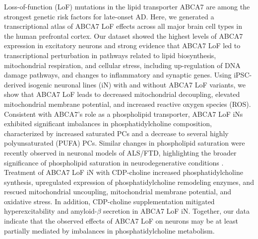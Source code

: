 Loss-of-function (LoF) mutations in the lipid transporter ABCA7 are among the strongest genetic risk factors for late-onset AD. Here, we generated a transcriptional atlas of ABCA7 LoF effects across all major brain cell types in the human prefrontal cortex. Our dataset showed the highest levels of ABCA7 expression in excitatory neurons and strong evidence that ABCA7 LoF led to transcriptional perturbation in pathways related to lipid biosynthesis, mitochondrial respiration, and cellular stress, including up-regulation of DNA damage pathways, and changes to inflammatory and synaptic genes. Using iPSC-derived isogenic neuronal lines (iN) with and without ABCA7 LoF variants, we show that ABCA7 LoF leads to decreased mitochondrial decoupling, elevated mitochondrial membrane potential, and increased reactive oxygen species (ROS). Consistent with ABCA7’s role as a phospholipid transporter, ABCA7 LoF iNs exhibited significant imbalances in phosphatidylcholine composition, characterized by increased saturated PCs and a decrease to several highly polyunsaturated (PUFA) PCs. Similar changes in phospholipid saturation were recently observed in neuronal models of ALS/FTD, highlighting the broader significance of phospholipid saturation in neurodegenerative conditions \cite{Giblin2025-ri}. Treatment of ABCA7 LoF iN with CDP-choline increased phosphatidylcholine synthesis, upregulated expression of phosphatidylcholine remodeling enzymes, and rescued mitochondrial uncoupling, mitochondrial membrane potential, and oxidative stress. In addition, CDP-choline supplementation mitigated hyperexcitability and amyloid-$\beta$ secretion in ABCA7 LoF iN. Together, our data indicate that the observed effects of ABCA7 LoF on neurons may be at least partially mediated by imbalances in phosphatidylcholine metabolism. 

